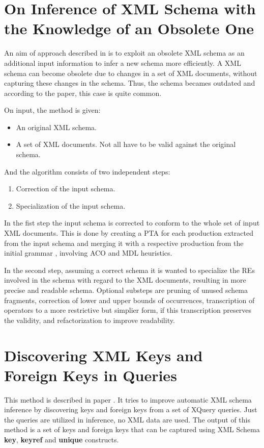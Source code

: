 \section{On Inference of XML Schema with the Knowledge of an Obsolete One}
An aim of approach described in \cite{Mlynkova:2009:IXS:1862681.1862693} is to exploit an obsolete XML schema as an additional input information to infer a new schema more efficiently. A XML schema can become obsolete due to changes in a set of XML documents, without capturing these changes in the schema. Thus, the schema becames outdated and according to the paper, this case is quite common.

On input, the method is given:
\begin{itemize}
\item An original XML schema.
\item A set of XML documents. Not all have to be valid against the original schema.
\end{itemize}

And the algorithm consists of two independent steps:

\begin{enumerate}
\item Correction of the input schema.
\item Specialization of the input schema.
\end{enumerate}

In the fist step the input schema is corrected to conform to the whole set of input XML documents. This is done by creating a PTA  for each production extracted from the input schema and merging it with a respective production from the initial grammar , involving ACO and MDL heuristics.

In the second step, assuming a correct schema it is wanted to specialize the REs involved in the schema with regard to the XML documents, resulting in more precise and readable schema. Optional substeps are pruning of unused schema fragments, correction of lower and upper bounds of occurrences, transcription of operators to a more restrictive but simplier form, if this transcription preserves the validity, and refactorization to improve readability.

\section{Discovering XML Keys and Foreign Keys in Queries}
This method is described in paper \cite{Necasky:2009:DXK:1529282.1529414}. It tries to improve automatic XML schema inference by discovering keys and foreign keys from a set of XQuery queries. Just the queries are utilized in inference, no XML data are used. The output of this method is a set of keys and foreign keys that can be captured using XML Schema \textbf{key}, \textbf{keyref} and \textbf{unique} constructs.

